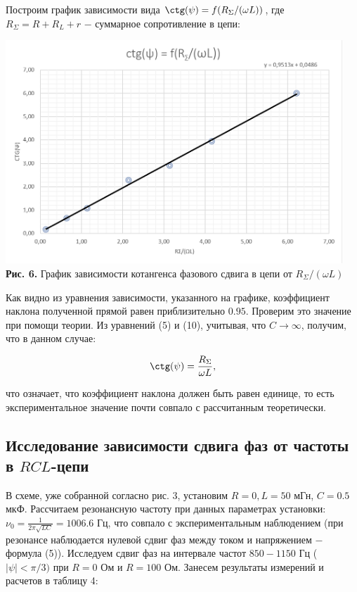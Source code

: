 \documentclass[a4paper,12pt]{article} %
\begin{document}
\hfill \break Построим график зависимости вида $\ctg(\psi) = f(R_{\Sigma}/(\omega L))$, где $R_{\Sigma} = R + R_{L} + r$ $-$ суммарное сопротивление в цепи:

\begin{center}
\includegraphics[width=0.95\textwidth]{3.2.1_6.png}\\
\textbf{Рис. 6.} График зависимости котангенса фазового сдвига в цепи от $R_{\Sigma}/(\omega L)$ \\
\end{center}

\hfill \break Как видно из уравнения зависимости, указанного на графике, коэффициент наклона полученной прямой равен приблизительно $0.95$. Проверим это значение при помощи теории. Из уравнений (5) и (10), учитывая, что $C \rightarrow \infty$, получим, что в данном случае:

$$
\ctg(\psi) = \frac{R_{\Sigma}}{\omega L},
$$

\hfill \break что означает, что коэффициент наклона должен быть равен единице, то есть экспериментальное значение почти совпало с рассчитанным теоретически. 

\subsection{Исследование зависимости сдвига фаз от частоты в $RCL$-цепи}
\hfill \break В схеме, уже собранной согласно рис. 3, установим $R = 0, L = 50$ мГн, $C = 0.5$ мкФ. Рассчитаем резонансную частоту при данных параметрах установки: $\nu_{0} = \frac{1}{2\pi \sqrt{LC}} = 1006.6$ Гц, что совпало с экспериментальным наблюдением (при резонансе наблюдается нулевой сдвиг фаз между током и напряжением $-$ формула (5)). Исследуем сдвиг фаз на интервале частот $850 - 1150$ Гц ($|\psi| < \pi/3)$ при $R = 0$ Ом и $R = 100$ Ом. Занесем результаты измерений и расчетов в таблицу 4:
\end{document}
